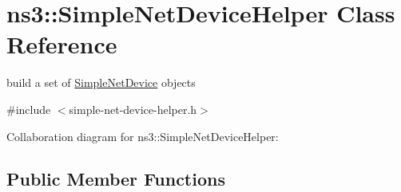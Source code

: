 \hypertarget{classns3_1_1SimpleNetDeviceHelper}{}\section{ns3\+:\+:Simple\+Net\+Device\+Helper Class Reference}
\label{classns3_1_1SimpleNetDeviceHelper}


build a set of \hyperlink{classns3_1_1SimpleNetDevice}{Simple\+Net\+Device} objects  




{\ttfamily \#include $<$simple-\/net-\/device-\/helper.\+h$>$}



Collaboration diagram for ns3\+:\+:Simple\+Net\+Device\+Helper\+:
\subsection*{Public Member Functions}
